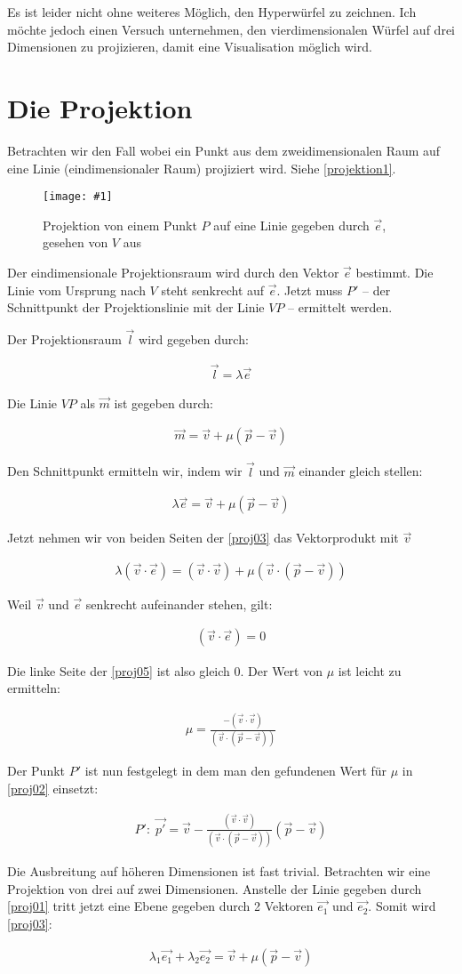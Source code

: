 \documentclass[10pt,a4paper,twoside,titlepage]{article}
\newcommand{\myeq}[2]{
	\begin{equation}
		\begin{split}
			#1
		\end{split}
		\label{#2}
	\end{equation}
}
\newcommand{\image}[4]{
	\begin{figure}[!ht]
		\centering
		\texttt{[image: \#1]}
		\caption{#2}
		\label{#3}
	\end{figure}
}
\begin{document}
Es ist leider nicht ohne weiteres Möglich, den Hyperwürfel zu zeichnen.
Ich möchte jedoch einen Versuch unternehmen, den vierdimensionalen Würfel
auf drei Dimensionen zu projizieren, damit eine Visualisation möglich wird.

\section{Die Projektion}
Betrachten wir den Fall wobei ein Punkt aus dem zweidimensionalen
Raum auf eine Linie (eindimensionaler Raum) projiziert wird.
Siehe \autoref{projektion1}.
\image{img/Projektion.eps}{Projektion von einem Punkt $P$ auf 
	eine Linie gegeben durch $\vec{e}$, gesehen von $V$ aus}
	{projektion1}{6}
	
Der eindimensionale Projektionsraum wird durch den Vektor
$\vec{e}$ bestimmt. Die Linie vom Ursprung nach $V$ steht 
senkrecht auf $\vec{e}$.
Jetzt muss $P'$ -- der Schnittpunkt der
Projektionslinie mit der Linie $VP$ -- ermittelt werden.

Der Projektionsraum $\vec{l}$ wird gegeben durch:
\myeq{\vec{l}=\lambda \vec{e}}{proj01}

Die Linie $VP$ als $\vec{m}$ ist gegeben durch:
\myeq{\vec{m}=\vec{v} + \mu(\vec{p}-\vec{v})}{proj02}

Den Schnittpunkt ermitteln wir, indem wir $\vec{l}$ und $\vec{m}$
einander gleich stellen:
\myeq{\lambda \vec{e} = \vec{v} + \mu(\vec{p}-\vec{v})}{proj03}


Jetzt nehmen wir von beiden Seiten der \autoref{proj03} das Vektorprodukt
mit $\vec{v}$
\myeq{\lambda(\vec{v}\cdot\vec{e}) = (\vec{v}\cdot\vec{v}) + \mu 
	(\vec{v}\cdot(\vec{p}-\vec{v}))}{proj05}

Weil $\vec{v}$ und $\vec{e}$ senkrecht aufeinander stehen, gilt:
\myeq{(\vec{v}\cdot\vec{e}) = 0}{proj04}

Die linke Seite der \autoref{proj05} ist also gleich 0. Der Wert von
$\mu$ ist leicht zu ermitteln:
\myeq{\mu = \frac{-(\vec{v}\cdot\vec{v})}
	{(\vec{v}\cdot(\vec{p}-\vec{v}))}}{proj06}
	
Der Punkt $P'$ ist nun festgelegt in dem man den gefundenen Wert
für $\mu$ in \autoref{proj02} einsetzt:
\myeq{P':\; \vec{p'} = \vec{v} -  \frac{(\vec{v}\cdot\vec{v})}
	{(\vec{v}\cdot(\vec{p}-\vec{v}))}(\vec{p}-\vec{v})}{proj07}

Die Ausbreitung auf höheren Dimensionen ist fast trivial. Betrachten wir
eine Projektion von drei auf zwei Dimensionen. Anstelle der Linie gegeben durch
\autoref{proj01} tritt jetzt eine Ebene gegeben durch 2 Vektoren
$\vec{e_1}$ und $\vec{e_2}$. Somit wird \autoref{proj03}:
\myeq{
	\lambda_1\vec{e_1} + \lambda_2\vec{e_2} = \vec{v} + \mu(\vec{p}-\vec{v})
}{proj08}
\end{document}
